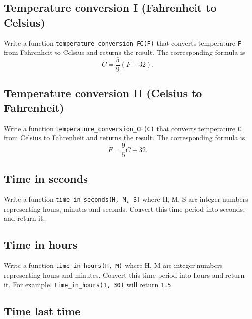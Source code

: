 
\subsection{Temperature conversion I (Fahrenheit to Celsius)}

Write a function {\tt temperature\_conversion\_FC(F)} that converts 
temperature {\tt F} from Fahrenheit to Celsius and returns the
result. The corresponding formula is 
$$
C = \frac{5}{9}(F - 32).
$$


\subsection{Temperature conversion II (Celsius to Fahrenheit)}

Write a function {\tt temperature\_conversion\_CF(C)} that converts 
temperature {\tt C} from Celsius to Fahrenheit and returns the
result. The corresponding formula is 
$$
F = \frac{9}{5}C + 32.
$$


\subsection{Time in seconds}

Write a function {\tt time\_in\_seconds(H, M, S)} where H, M, S are
integer numbers representing hours, minutes and seconds. Convert this 
time period into seconds, and return it. 


\subsection{Time in hours}

Write a function {\tt time\_in\_hours(H, M)} where H, M are
integer numbers representing hours and minutes. Convert this 
time period into hours and return it. For example, {\tt time\_in\_hours(1, 30)}
will return {\tt 1.5}.


\subsection{Time last time}

